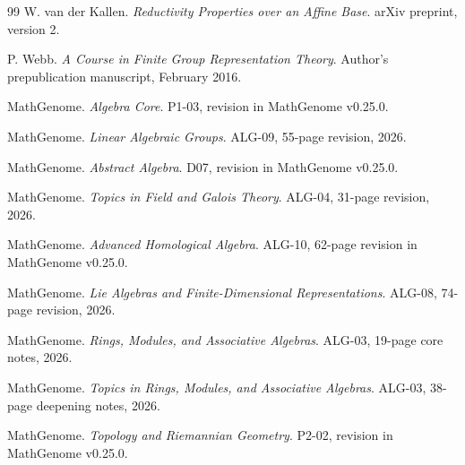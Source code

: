 \documentclass[11pt,oneside,openany]{book}
\theoremstyle{definition}
\theoremstyle{remark}
\begin{document}
\begin{thebibliography}{99}
W. van der Kallen.
\emph{Reductivity Properties over an Affine Base}.
arXiv preprint, version 2.

P. Webb.
\emph{A Course in Finite Group Representation Theory}.
Author's prepublication manuscript, February 2016.

MathGenome.
\emph{Algebra Core}. P1-03, revision in MathGenome v0.25.0.

MathGenome.
\emph{Linear Algebraic Groups}. ALG-09, 55-page revision, 2026.

MathGenome.
\emph{Abstract Algebra}. D07, revision in MathGenome v0.25.0.

MathGenome.
\emph{Topics in Field and Galois Theory}. ALG-04, 31-page revision, 2026.

MathGenome.
\emph{Advanced Homological Algebra}. ALG-10, 62-page revision in
MathGenome v0.25.0.

MathGenome.
\emph{Lie Algebras and Finite-Dimensional Representations}.
ALG-08, 74-page revision, 2026.

MathGenome.
\emph{Rings, Modules, and Associative Algebras}. ALG-03, 19-page core notes, 2026.

MathGenome.
\emph{Topics in Rings, Modules, and Associative Algebras}.
ALG-03, 38-page deepening notes, 2026.

MathGenome.
\emph{Topology and Riemannian Geometry}. P2-02, revision in MathGenome v0.25.0.

\end{thebibliography}
\endgroup
\end{document}
